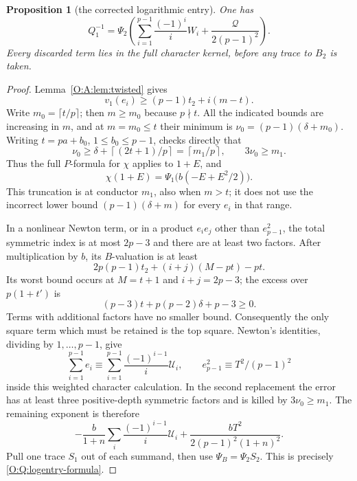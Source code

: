 \documentclass[11pt]{amsart}
\newtheorem{proposition}[theorem]{Proposition}
\theoremstyle{definition}
\theoremstyle{remark}
\newcommand{\ceil}[1]{\left\lceil #1\right\rceil}
\begin{document}
\begin{proposition}[the corrected logarithmic entry]\label{O:Q:logentry}
One has
\begin{equation}\label{O:Q:logentry-formula}
 Q_1^{-1}=\Psi_2\!\left(
       \sum_{i=1}^{p-1}\frac{(-1)^i}{i}W_i
       +\frac{\mathcal Q}{2(p-1)^2}\right).
\end{equation}
Every discarded term lies in the \emph{full} character kernel, before
any trace to $B_2$ is taken.
\end{proposition}
\begin{proof}
Lemma~\ref{O:A:lem:twisted} gives
\[
 v_1(e_i)\ge(p-1)t_2+i(m-t).
\]
Write $m_0=\lceil t/p\rceil$; then $m\ge m_0$ because $p\nmid t$.
All the indicated bounds are increasing in $m$, and at $m=m_0\le t$
their minimum is
$\nu_0=(p-1)(\delta+m_0)$.
Writing $t=pa+b_0$, $1\le b_0\le p-1$, checks directly that
\[
 \nu_0\ge\delta+\ceil{(2t+1)/p}=\ceil{m_1/p},\qquad
 3\nu_0\ge m_1.
\]
Thus the full $P$-formula for $\chi$ applies to $1+E$, and
\[
 \chi(1+E)=\Psi_1\bigl(b(-E+E^2/2)\bigr).
\]
This truncation is at conductor $m_1$, also when $m>t$; it does not use
the incorrect lower bound $(p-1)(\delta+m)$ for every $e_i$ in that range.

In a nonlinear Newton term, or in a product $e_i e_j$ other than
$e_{p-1}^2$, the total symmetric index is at most $2p-3$ and there
are at least two factors. After multiplication by $b$, its $B$-valuation
is at least
\[
 2p(p-1)t_2+(i+j)(M-pt)-pt.
\]
Its worst bound occurs at $M=t+1$ and $i+j=2p-3$; the excess over
$p(1+t')$ is
\[
 (p-3)t+p(p-2)\delta+p-3\ge0.
\]
Terms with additional factors have no smaller bound.
Consequently the only square term which must be retained is the top
square. Newton's identities, dividing by $1,\ldots,p-1$, give
\[
 \sum_{i=1}^{p-1}e_i
 \equiv\sum_{i=1}^{p-1}\frac{(-1)^{i-1}}{i}\mathcal U_i,
 \qquad e_{p-1}^2\equiv T^2/(p-1)^2
\]
inside this weighted character calculation. In the second replacement
the error has at least three positive-depth symmetric factors and is
killed by $3\nu_0\ge m_1$.
The remaining exponent is therefore
\[
 -\frac{b}{1+n}\sum_i\frac{(-1)^{i-1}}i \mathcal U_i
       +\frac{bT^2}{2(p-1)^2(1+n)^2}.
\]
Pull one trace $S_1$ out of each summand, then use
$\Psi_B=\Psi_2S_2$. This is precisely \eqref{O:Q:logentry-formula}.
\end{proof}
\end{document}
